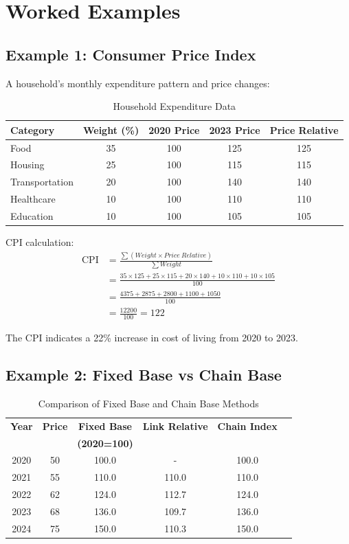 \documentclass[twoside]{book}
\begin{document}
\section{Worked Examples}

\subsection{Example 1: Consumer Price Index}

A household's monthly expenditure pattern and price changes:

\begin{table}[h]
\centering
\caption{Household Expenditure Data}
\begin{tabular}{lcccc}
\toprule
\textbf{Category} & \textbf{Weight (\%)} & \textbf{2020 Price} & \textbf{2023 Price} & \textbf{Price Relative} \\
\midrule
Food & 35 & 100 & 125 & 125 \\
Housing & 25 & 100 & 115 & 115 \\
Transportation & 20 & 100 & 140 & 140 \\
Healthcare & 10 & 100 & 110 & 110 \\
Education & 10 & 100 & 105 & 105 \\
\bottomrule
\end{tabular}
\end{table}

CPI calculation:
\begin{align}
\text{CPI} &= \frac{\sum (Weight \times Price\ Relative)}{\sum Weight} \\
&= \frac{35 \times 125 + 25 \times 115 + 20 \times 140 + 10 \times 110 + 10 \times 105}{100} \\
&= \frac{4375 + 2875 + 2800 + 1100 + 1050}{100} \\
&= \frac{12200}{100} = 122
\end{align}

The CPI indicates a 22\% increase in cost of living from 2020 to 2023.

\subsection{Example 2: Fixed Base vs Chain Base}

\begin{table}[h]
\centering
\caption{Comparison of Fixed Base and Chain Base Methods}
\begin{tabular}{cccccc}
\toprule
\textbf{Year} & \textbf{Price} & \textbf{Fixed Base} & \textbf{Link Relative} & \textbf{Chain Index} \\
 & & \textbf{(2020=100)} & & \\
\midrule
2020 & 50 & 100.0 & - & 100.0 \\
2021 & 55 & 110.0 & 110.0 & 110.0 \\
2022 & 62 & 124.0 & 112.7 & 124.0 \\
2023 & 68 & 136.0 & 109.7 & 136.0 \\
2024 & 75 & 150.0 & 110.3 & 150.0 \\
\bottomrule
\end{tabular}
\end{table}
\end{document}
